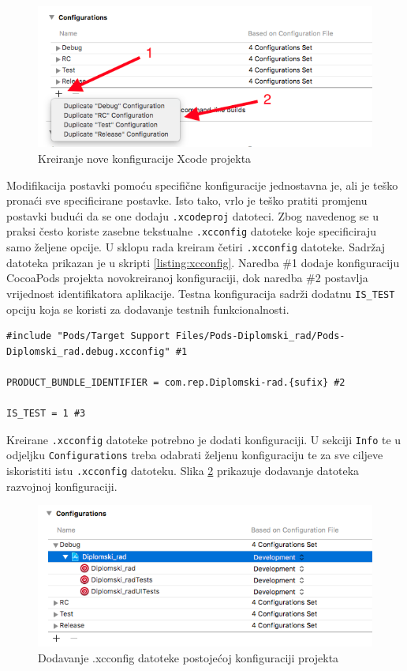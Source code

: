 \documentclass[times, utf8, diplomski, numeric]{fer}
\begin{document}
\begin{figure}[b!]
\centering
\includegraphics[scale=0.6]{XcodeConfigurationCreation}
\caption{Kreiranje nove konfiguracije Xcode projekta}
\label{fig:XcodeConfigurationCreation}
\end{figure}

Modifikacija postavki pomoću specifične konfiguracije jednostavna je, ali je teško pronaći sve specificirane postavke. Isto tako, vrlo je teško pratiti promjenu postavki budući da se one dodaju \verb|.xcodeproj| datoteci. Zbog navedenog se u praksi često koriste zasebne tekstualne \verb|.xcconfig| datoteke koje specificiraju samo željene opcije. U sklopu rada kreiram četiri \verb|.xcconfig| datoteke. Sadržaj datoteka prikazan je u skripti \ref{listing:xcconfig}. Naredba \#1 dodaje konfiguraciju CocoaPods projekta novokreiranoj konfiguraciji, dok naredba \#2 postavlja vrijednost identifikatora aplikacije. Testna konfiguracija sadrži dodatnu \verb|IS_TEST| opciju koja se koristi za dodavanje testnih funkcionalnosti.

\begin{lstlisting}[caption=Sadržaj .xcconfig datoteke, label=listing:xcconfig]
#include "Pods/Target Support Files/Pods-Diplomski_rad/Pods-Diplomski_rad.debug.xcconfig" #1

PRODUCT_BUNDLE_IDENTIFIER = com.rep.Diplomski-rad.{sufix} #2

IS_TEST = 1 #3
\end{lstlisting}

Kreirane \verb|.xcconfig| datoteke potrebno je dodati konfiguraciji. U sekciji \verb|Info| te u odjeljku \verb|Configurations| treba odabrati željenu konfiguraciju te za sve ciljeve iskoristiti istu \verb|.xcconfig| datoteku. Slika \ref{fig:XcodeXCConfigSet} prikazuje dodavanje datoteka razvojnoj konfiguraciji.

\begin{figure}
\centering
\includegraphics[scale=0.6]{XcodeXCConfigSet}
\caption{Dodavanje .xcconfig datoteke postojećoj konfiguraciji projekta}
\label{fig:XcodeXCConfigSet}
\end{figure}
\end{document}
